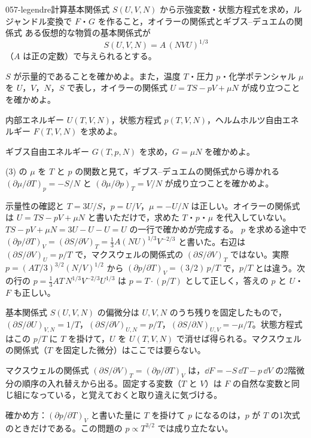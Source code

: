 \documentclass[uplatex,dvipdfmx,a4paper,11pt]{jsarticle}
\begin{document}
\begin{mondai}{057-legendre}{計算}{基本関係式 $S(U,V,N)$ から示強変数・状態方程式を求め，ルジャンドル変換で $F$・$G$ を作ること，オイラーの関係式とギブス--デュエムの関係式}
ある仮想的な物質の基本関係式が
\[ S(U,V,N)=A\,(NVU)^{1/3} \]
（$A$ は正の定数）で与えられるとする。
\begin{shoumon}
  \item $S$ が示量的であることを確かめよ。また，温度 $T$・圧力 $p$・化学ポテンシャル $\mu$ を $U$，$V$，$N$，$S$ で表し，オイラーの関係式 $U=TS-pV+\mu N$ が成り立つことを確かめよ。
  \item 内部エネルギー $U(T,V,N)$，状態方程式 $p(T,V,N)$，ヘルムホルツ自由エネルギー $F(T,V,N)$ を求めよ。
  \item ギブス自由エネルギー $G(T,p,N)$ を求め，$G=\mu N$ を確かめよ。
  \item (3) の $\mu$ を $T$ と $p$ の関数と見て，ギブス--デュエムの関係式から導かれる $(\partial\mu/\partial T)_{p}=-S/N$ と $(\partial\mu/\partial p)_{T}=V/N$ が成り立つことを確かめよ。
\end{shoumon}

\begin{kotaeran}
   示量性の確認と $T=3U/S$，$p=U/V$，$\mu=-U/N$ は正しい。オイラーの関係式は $U=TS-pV+\mu N$ と書いただけで，求めた $T$・$p$・$\mu$ を代入していない。$TS-pV+\mu N=3U-U-U=U$ の一行で確かめが完成する。
   $p$ を求める途中で $(\partial p/\partial T)_{V}=(\partial S/\partial V)_{T}=\frac{1}{3}A(NU)^{1/3}V^{-2/3}$ と書いた。右辺は $(\partial S/\partial V)_{U}=p/T$ で，マクスウェルの関係式の $(\partial S/\partial V)_{T}$ ではない。実際 $p=(AT/3)^{3/2}(N/V)^{1/2}$ から $(\partial p/\partial T)_{V}=(3/2)\,p/T$ で，$p/T$ とは違う。次の行の $p=\frac{1}{3}AT\,N^{1/3}V^{-2/3}U^{1/3}$ は $p=T\cdot(p/T)$ として正しく，答えの $p$ と $U$・$F$ も正しい。
\end{kotaeran}
\begin{rikai}
  \item 基本関係式 $S(U,V,N)$ の偏微分は $U,V,N$ のうち残りを固定したもので，$(\partial S/\partial U)_{V,N}=1/T$，$(\partial S/\partial V)_{U,N}=p/T$，$(\partial S/\partial N)_{U,V}=-\mu/T$。状態方程式はこの $p/T$ に $T$ を掛けて，$U$ を $U(T,V,N)$ で消せば得られる。マクスウェルの関係式（$T$ を固定した微分）はここでは要らない。
  \item マクスウェルの関係式 $(\partial S/\partial V)_{T}=(\partial p/\partial T)_{V}$ は，$\dd F=-S\,\dd T-p\,\dd V$ の2階微分の順序の入れ替えから出る。固定する変数（$T$ と $V$）は $F$ の自然な変数と同じ組になっている，と覚えておくと取り違えに気づける。
  \item 確かめ方：$(\partial p/\partial T)_{V}$ と書いた量に $T$ を掛けて $p$ になるのは，$p$ が $T$ の1次式のときだけである。この問題の $p\propto T^{3/2}$ では成り立たない。
\end{rikai}
\end{mondai}
\end{document}
